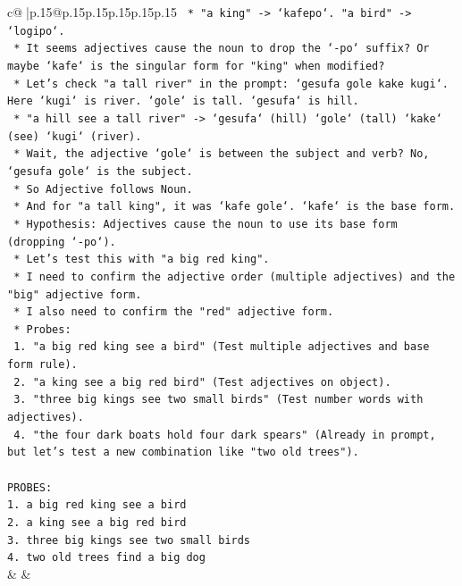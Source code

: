\documentclass{article}
\begin{document}
{\begin{supertabular}{c@{$\;$}|p{.15\linewidth}@{}p{.15\linewidth}p{.15\linewidth}p{.15\linewidth}p{.15\linewidth}p{.15\linewidth}}
{{{\texttt{    *   "a king" {-}> `kafepo`. "a bird" {-}> `logipo`.} \\
\texttt{    *   It seems adjectives cause the noun to drop the `{-}po` suffix? Or maybe `kafe` is the singular form for "king" when modified?} \\
\texttt{    *   Let's check "a tall river" in the prompt: `gesufa gole kake kugi`. Here `kugi` is river. `gole` is tall. `gesufa` is hill.} \\
\texttt{    *   "a hill see a tall river" {-}> `gesufa` (hill) `gole` (tall) `kake` (see) `kugi` (river).} \\
\texttt{    *   Wait, the adjective `gole` is between the subject and verb? No, `gesufa gole` is the subject.} \\
\texttt{    *   So Adjective follows Noun.} \\
\texttt{    *   And for "a tall king", it was `kafe gole`. `kafe` is the base form.} \\
\texttt{    *   Hypothesis: Adjectives cause the noun to use its base form (dropping `{-}po`).} \\
\texttt{    *   Let's test this with "a big red king".} \\
\texttt{    *   I need to confirm the adjective order (multiple adjectives) and the "big" adjective form.} \\
\texttt{    *   I also need to confirm the "red" adjective form.} \\
\texttt{    *   Probes:} \\
\texttt{        1.  "a big red king see a bird" (Test multiple adjectives and base form rule).} \\
\texttt{        2.  "a king see a big red bird" (Test adjectives on object).} \\
\texttt{        3.  "three big kings see two small birds" (Test number words with adjectives).} \\
\texttt{        4.  "the four dark boats hold four dark spears" (Already in prompt, but let's test a new combination like "two old trees").} \\
\\ 
\texttt{PROBES:} \\
\texttt{1. a big red king see a bird} \\
\texttt{2. a king see a big red bird} \\
\texttt{3. three big kings see two small birds} \\
\texttt{4. two old trees find a big dog} \\
            }
        }
    }
    & & \\ \\


\end{supertabular}}
\end{document}
